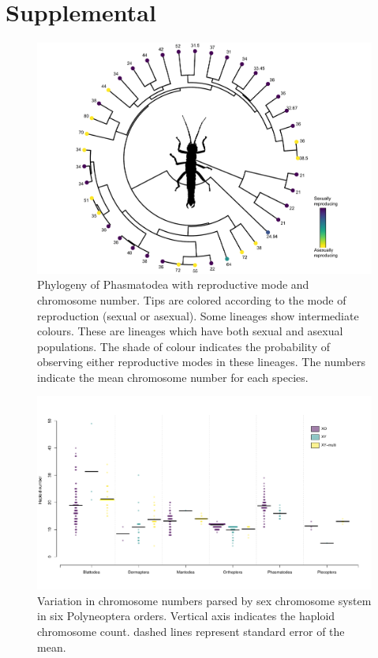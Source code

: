 \section{Supplemental}
\setcounter{figure}{0}
\renewcommand{\thefigure}{S\arabic{figure}}
\setcounter{table}{0}
\renewcommand{\thetable}{S\arabic{table}}

\begin{figure}[!ht]
\centering \includegraphics[width=1\textwidth]{figures/phasmatodea_phylogeny.pdf}
\caption{Phylogeny of Phasmatodea with reproductive mode and chromosome number. Tips are colored according to the mode of reproduction (sexual or asexual). Some lineages show intermediate colours. These are lineages which have both sexual and asexual populations. The shade of colour indicates the probability of observing either reproductive modes in these lineages. The numbers indicate the mean chromosome number for each species.}
\label{fig:phas.phylo}
\end{figure}

\begin{figure}
\centering \includegraphics[width=1\textwidth]{figures/Preliminary_data.pdf}
\caption{
Variation in chromosome numbers parsed by sex chromosome system in six Polyneoptera orders. Vertical axis indicates the haploid chromosome count. dashed lines represent standard error of the mean.
}
\label{fig:order.plots}
\end{figure}

